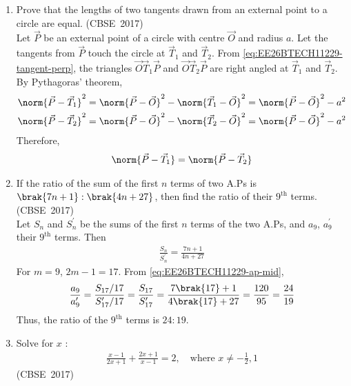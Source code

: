 \begin{enumerate}[label=\thesubsection.\arabic*, ref=\thesubsection.\theenumi]
Water conservation is essential because fresh water is limited. Rain-water harvesting reduces the dependence on groundwater, recharges the water table and reduces flooding. Every individual should save water in daily life.
\item 
Prove that the lengths of two tangents drawn from an external point to a circle are equal.
\hfill (CBSE~2017)
\\
\solution
Let $\vec{P}$ be an external point of a circle with centre $\vec{O}$ and radius $a$. Let the tangents from $\vec{P}$ touch the circle at $\vec{T}_1$ and $\vec{T}_2$. From \eqref{eq:EE26BTECH11229-tangent-perp}, the triangles $\vec{O}\vec{T}_1\vec{P}$ and $\vec{O}\vec{T}_2\vec{P}$ are right angled at $\vec{T}_1$ and $\vec{T}_2$. By Pythagoras' theorem,
\begin{align}
	\norm{\vec{P}-\vec{T}_1}^2 &= \norm{\vec{P}-\vec{O}}^2 - \norm{\vec{T}_1-\vec{O}}^2 = \norm{\vec{P}-\vec{O}}^2 - a^2
	\\
	\norm{\vec{P}-\vec{T}_2}^2 &= \norm{\vec{P}-\vec{O}}^2 - \norm{\vec{T}_2-\vec{O}}^2 = \norm{\vec{P}-\vec{O}}^2 - a^2
\end{align}
Therefore,
\begin{align}
	\norm{\vec{P}-\vec{T}_1} = \norm{\vec{P}-\vec{T}_2}
\end{align}
\item 
If the ratio of the sum of the first $n$ terms of two A.Ps is $\brak{7n + 1} : \brak{4n + 27}$, then find the ratio of their $9^{\text{th}}$ terms.
\hfill (CBSE~2017)
\\
\solution
Let $S_n$ and $S_n^{\prime}$ be the sums of the first $n$ terms of the two A.Ps, and $a_9$, $a_9^{\prime}$ their $9^{\text{th}}$ terms. Then
\begin{align}
	\frac{S_n}{S_n^{\prime}} = \frac{7n+1}{4n+27}
\end{align}
For $m = 9$, $2m - 1 = 17$. From \eqref{eq:EE26BTECH11229-ap-mid},
\begin{align}
	\frac{a_9}{a_9^{\prime}} = \frac{S_{17}/17}{S_{17}^{\prime}/17} = \frac{S_{17}}{S_{17}^{\prime}}
	= \frac{7\brak{17} + 1}{4\brak{17} + 27} = \frac{120}{95} = \frac{24}{19}
\end{align}
Thus, the ratio of the $9^{\text{th}}$ terms is $24:19$.
\item 
Solve for $x$ :
\begin{align*}
	\frac{x-1}{2x+1} + \frac{2x+1}{x-1} = 2, \quad \text{where } x \neq -\frac{1}{2}, 1
\end{align*}
\hfill (CBSE~2017)
\\

\end{enumerate}
